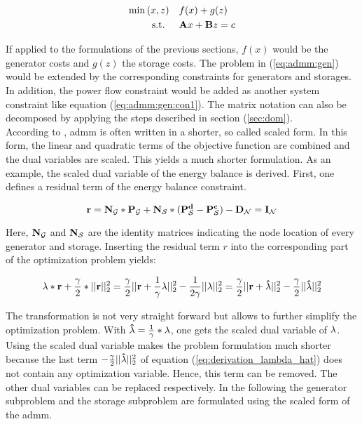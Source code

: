 \begin{subequations}
	\begin{align}
		\min{(x, z)} \quad & f(x) + g(z) \label{eq:admm:gen}\\
		\text{s.t. } \quad & \vb{A}x + \vb{B}z = c \label{eq:admm:gen:con1}
	\end{align}
\end{subequations}

If applied to the formulations of the previous sections, $f(x)$ would be the generator costs and $g(z)$ the storage costs. The problem in (\ref{eq:admm:gen}) would be extended by the corresponding constraints for generators and storages. In addition, the power flow constraint would be added as another system constraint like equation (\ref{eq:admm:gen:con1}). The matrix notation can also be decomposed by applying the steps described in section (\ref{sec:dom}). \\

According to \citet{Boyd-2010-DistributedOptimizationStatistical}, \gls{admm} is often written in a shorter, so called scaled form. In this form, the linear and quadratic terms of the objective function are combined and the dual variables are scaled. This yields a much shorter formulation. As an example, the scaled dual variable of the energy balance is derived. First, one defines a residual term of the energy balance constraint.

\begin{equation}
	\vb{r} = \vb{N_\mathcal{G}}*\vb{P_\mathcal{G}} + \vb{N_\mathcal{S}}*(\vb{P_\mathcal{S}^d} - \vb{P_\mathcal{S}^c}) - \vb{D_\mathcal{N}} = \vb{I_\mathcal{N}}
\end{equation}

Here, $\vb{N_\mathcal{G}}$ and $\vb{N_\mathcal{S}}$ are the identity matrices indicating the node location of every generator and storage. Inserting the residual term $r$ into the corresponding part of the optimization problem yields:

\begin{equation}
	\vb{\lambda} * \vb{r} + \frac{\gamma}{2} * || \vb{r} ||^2_2 = \frac{\gamma}{2} || \vb{r} + \frac{1}{\gamma}\vb{\lambda} ||^2_2 - \frac{1}{2\gamma}|| \vb{\lambda} ||^2_2 = \frac{\gamma}{2} || \vb{r} + \vb{\hat{\lambda}} ||^2_2 - \frac{\gamma}{2}|| \vb{\hat{\lambda}} ||^2_2 \label{eq:derivation_lambda_hat}
\end{equation}

The transformation is not very straight forward but allows to further simplify the  optimization problem. With $\vb{\hat{\lambda}} = \frac{1}{\gamma}*\vb{\lambda}$, one gets the scaled dual variable of $\vb{\lambda}$. Using the scaled dual variable makes the problem formulation much shorter because the last term $- \frac{\gamma}{2}|| \vb{\hat{\lambda}} ||^2_2$ of equation (\ref{eq:derivation_lambda_hat}) does not contain any optimization variable. Hence, this term can be removed. The other dual variables can be replaced respectively. In the following the generator subproblem and the storage subproblem are formulated using the scaled form of the \gls{admm}.

